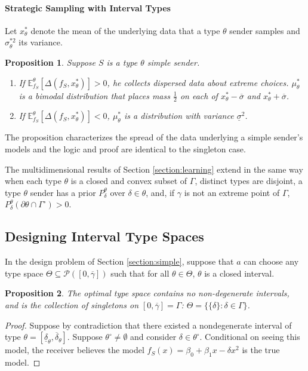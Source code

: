 \documentclass[11pt,dvipsnames]{article}
\newtheorem{proposition}{Proposition}
\begin{document}
\begin{appendix}
\paragraph{Strategic Sampling with Interval Types}
Let $x_\theta^*$ denote the mean of the underlying data that a type $\theta$ sender samples and $\sigma_\theta^{*2}$ its variance.
\begin{proposition}
Suppose $S$ is a type $\theta$ simple sender.
\begin{enumerate}
\item If $\mathbb{E}_{f_S}^\theta[\Delta(f_S,x_\theta^*)]>0$, he collects \emph{dispersed} data about extreme choices. $\mu_\theta^*$ is a bimodal distribution that places mass $\frac{1}{2}$ on each of $x_\theta^*-\overline{\sigma}$ and $x_\theta^*+\overline{\sigma}$. 
\item If $\mathbb{E}_{f_S}^\theta[\Delta(f_S,x_\theta^*)]<0$, $\mu_\theta^*$ is a distribution with variance $\underline{\sigma}^2$.
\end{enumerate}
\label{prop:samplingintervals}
\end{proposition}
The proposition characterizes the spread of the data underlying a simple sender's models and the logic and proof are identical to the singleton case.

The multidimensional results of Section \ref{section:learning} extend in the same way when each type $\theta$ is a closed and convex subset of $\Gamma$, distinct types are disjoint, a type $\theta$ sender has a prior $P_\delta^\theta$ over $\delta \in \theta$, and, if $\gamma$ is not an extreme point of $\Gamma$, $P_\delta^\theta(\partial \theta \cap \Gamma^\circ) > 0$.

\subsection{Designing Interval Type Spaces}\label{section:designintervals}
In the design problem of Section \ref{section:simple}, suppose that $a$ can choose any type space $\Theta \subseteq \mathcal{P}([0,\overline{\gamma}])$ such that for all $\theta \in \Theta$, $\theta$ is a closed interval.
\begin{proposition}
The optimal type space contains no non-degenerate intervals, and is the collection of singletons on $[0,\overline{\gamma}]=\Gamma$: $\Theta = \big\{\{\delta\} : \delta \in \Gamma\big\}$.
\label{prop:optimaltypeintervals}
\end{proposition}

\begin{proof}
Suppose by contradiction that there existed a nondegenerate interval of type $\theta = [\underline{\delta}_\theta,\overline{\delta}_\theta]$.
Suppose $\theta^\circ \neq \emptyset$ and consider $\delta \in \theta^\circ$.
Conditional on seeing this model, the receiver believes the model $f_S(x) = \beta_0+\beta_1x-\delta x^2$ is the true model.


\end{proof}
\end{appendix}
\end{document}
